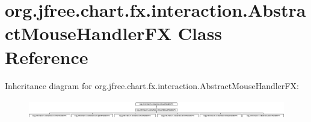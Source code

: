 \hypertarget{classorg_1_1jfree_1_1chart_1_1fx_1_1interaction_1_1_abstract_mouse_handler_f_x}{}\section{org.\+jfree.\+chart.\+fx.\+interaction.\+Abstract\+Mouse\+Handler\+FX Class Reference}
\label{classorg_1_1jfree_1_1chart_1_1fx_1_1interaction_1_1_abstract_mouse_handler_f_x}
Inheritance diagram for org.\+jfree.\+chart.\+fx.\+interaction.\+Abstract\+Mouse\+Handler\+FX\+:\begin{figure}[H]
\begin{center}
\leavevmode
\includegraphics[height=0.848485cm]{classorg_1_1jfree_1_1chart_1_1fx_1_1interaction_1_1_abstract_mouse_handler_f_x}
\end{center}
\end{figure}
